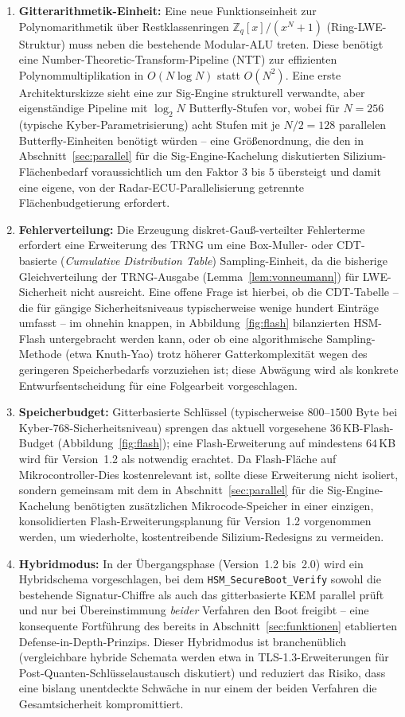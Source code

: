 ﻿\documentclass[a4paper,12pt]{article}
\theoremstyle{definition}
\begin{document}
\begin{enumerate}
	\item \textbf{Gitterarithmetik-Einheit:} Eine neue Funktionseinheit zur Polynomarithmetik über Restklassenringen $\mathbb{Z}_q[x]/(x^N+1)$ (Ring-LWE-Struktur) muss neben die bestehende Modular-ALU treten. Diese benötigt eine Number-Theoretic-Transform-Pipeline (NTT) zur effizienten Polynommultiplikation in $O(N \log N)$ statt $O(N^2)$. Eine erste Architekturskizze sieht eine zur Sig-Engine strukturell verwandte, aber eigenständige Pipeline mit $\log_2 N$ Butterfly-Stufen vor, wobei für $N=256$ (typische Kyber-Parametrisierung) acht Stufen mit je $N/2=128$ parallelen Butterfly-Einheiten benötigt würden -- eine Größenordnung, die den in Abschnitt~\ref{sec:parallel} für die Sig-Engine-Kachelung diskutierten Silizium-Flächenbedarf voraussichtlich um den Faktor $3$ bis $5$ übersteigt und damit eine eigene, von der Radar-ECU-Parallelisierung getrennte Flächenbudgetierung erfordert.
	\item \textbf{Fehlerverteilung:} Die Erzeugung diskret-Gauß-verteilter Fehlerterme erfordert eine Erweiterung des TRNG um eine Box-Muller- oder CDT-basierte (\emph{Cumulative Distribution Table}) Sampling-Einheit, da die bisherige Gleichverteilung der TRNG-Ausgabe (Lemma~\ref{lem:vonneumann}) für LWE-Sicherheit nicht ausreicht. Eine offene Frage ist hierbei, ob die CDT-Tabelle -- die für gängige Sicherheitsniveaus typischerweise wenige hundert Einträge umfasst -- im ohnehin knappen, in Abbildung~\ref{fig:flash} bilanzierten HSM-Flash untergebracht werden kann, oder ob eine algorithmische Sampling-Methode (etwa Knuth-Yao) trotz höherer Gatterkomplexität wegen des geringeren Speicherbedarfs vorzuziehen ist; diese Abwägung wird als konkrete Entwurfsentscheidung für eine Folgearbeit vorgeschlagen.
	\item \textbf{Speicherbudget:} Gitterbasierte Schlüssel (typischerweise $800$--$1500$ Byte bei Kyber-768-Sicherheitsniveau) sprengen das aktuell vorgesehene $36$\,KB-Flash-Budget (Abbildung~\ref{fig:flash}); eine Flash-Erweiterung auf mindestens $64$\,KB wird für Version~1.2 als notwendig erachtet. Da Flash-Fläche auf Mikrocontroller-Dies kostenrelevant ist, sollte diese Erweiterung nicht isoliert, sondern gemeinsam mit dem in Abschnitt~\ref{sec:parallel} für die Sig-Engine-Kachelung benötigten zusätzlichen Mikrocode-Speicher in einer einzigen, konsolidierten Flash-Erweiterungsplanung für Version~1.2 vorgenommen werden, um wiederholte, kostentreibende Silizium-Redesigns zu vermeiden.
	\item \textbf{Hybridmodus:} In der Übergangsphase (Version~1.2 bis~2.0) wird ein Hybridschema vorgeschlagen, bei dem \texttt{HSM\_SecureBoot\_Verify} sowohl die bestehende Signatur-Chiffre als auch das gitterbasierte KEM parallel prüft und nur bei Übereinstimmung \emph{beider} Verfahren den Boot freigibt -- eine konsequente Fortführung des bereits in Abschnitt~\ref{sec:funktionen} etablierten Defense-in-Depth-Prinzips. Dieser Hybridmodus ist branchenüblich (vergleichbare hybride Schemata werden etwa in TLS-1.3-Erweiterungen für Post-Quanten-Schlüsselaustausch diskutiert) und reduziert das Risiko, dass eine bislang unentdeckte Schwäche in nur einem der beiden Verfahren die Gesamtsicherheit kompromittiert.

\end{enumerate}
\end{document}
